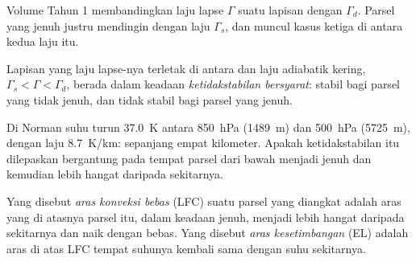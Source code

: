 Volume Tahun 1 membandingkan laju lapse $\Gamma$ suatu lapisan dengan $\Gamma_d$. Parsel yang jenuh
justru mendingin dengan laju $\Gamma_s$, dan muncul kasus ketiga di antara kedua laju itu.

\begin{definition}\label{def:b2:atmospheric-thermodynamics:instability}
Lapisan yang laju lapse-nya terletak di antara  dan laju adiabatik kering,
$\Gamma_s < \Gamma < \Gamma_d$, berada dalam keadaan \emph{ketidakstabilan bersyarat}:
stabil bagi parsel yang tidak jenuh, dan tidak stabil bagi parsel yang jenuh.
\end{definition}

Di Norman suhu turun \qty{37.0}{K} antara \qty{850}{hPa} (\qty{1489}{m}) dan
\qty{500}{hPa} (\qty{5725}{m}), dengan laju \qty{8.7}{K/km}:  sepanjang empat kilometer.
Apakah ketidakstabilan itu dilepaskan bergantung pada tempat parsel dari bawah menjadi jenuh dan
kemudian lebih hangat daripada sekitarnya.

\begin{definition}\label{def:b2:atmospheric-thermodynamics:parcel-levels}
Yang disebut \emph{aras konveksi bebas} (LFC) suatu parsel yang diangkat adalah
aras yang di atasnya parsel itu, dalam keadaan jenuh, menjadi lebih hangat daripada sekitarnya dan naik dengan bebas. Yang disebut
\emph{aras kesetimbangan} (EL) adalah aras di atas LFC tempat
suhunya kembali sama dengan suhu sekitarnya.
\end{definition}


